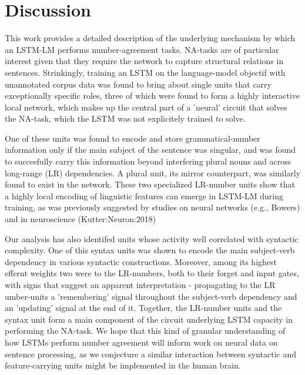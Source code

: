 
\section{Discussion}
This work provides a detailed description of the underlying mechanism by which an LSTM-LM performs number-agreement tasks. NA-tasks are of particular interest given that they require the network to capture structural relations in sentences. Strinkingly, training an LSTM on the language-model objectif with unannotated corpus data was found to bring about single units that carry exceptionally specific roles, three of which were found to form a highly interactive local network, which makes up the central part of a 'neural' circuit that solves the NA-task, which the LSTM was not explicitely trained to solve.

One of these units was found to encode and store grammatical-number information only if the main subject of the sentence was singular, and was found to succesfully carry this information beyond interfering plural nouns and across long-range (LR) dependencies. A plural unit, its mirror counterpart, was similarly found to exist in the network. These two specialized LR-number units show that a highly local encoding of linguistic features can emerge in LSTM-LM during training, as was previously suggested by studies on neural networks (e.g., Bowers) and in neuroscience (Kutter:Neuron:2018)

Our analysis has also identifed units whose activity well correlated with syntactic complexity. One of this syntax units was shown to encode the main subject-verb dependency in various syntactic constructions. Moreover, among its highest effernt weights two were to the LR-numbers, both to their forget and input gates, with signs that suggest an apparent interpretation - propagating to the LR umber-units a 'remembering' signal throughout the subject-verb dependency and an 'updating' signal at the end of it. Together, the LR-number units and the syntax unit form a main component of the circuit underlying LSTM capacity in performing the NA-task. We hope that this kind of granular understanding of how LSTMs perform number agreement will inform work on neural data on sentence processing, as we conjecture a similar interaction between syntactic and feature-carrying units might be implemented in the human brain.

